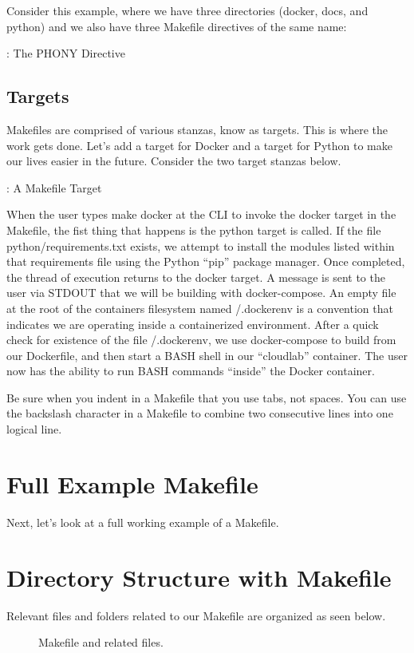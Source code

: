 \justify{}
Consider this example, where we have three directories (docker, docs, and python) and we also have three Makefile directives of the same name:

\begin{mybox}{\thetcbcounter: The PHONY Directive}
	
\end{mybox}

\subsection{Targets}

\justify{}
Makefiles are comprised of various stanzas, know as targets. This is where the work gets done. Let's add a target for Docker and a target for
Python to make our lives easier in the future. Consider the two target stanzas below.

\justify{}
\begin{mybox}{\thetcbcounter: A Makefile Target}
	
\end{mybox}

\justify{}
When the user types make docker at the CLI to invoke the docker target in the Makefile, the fist thing that happens is the python target is
called. If the file python/requirements.txt exists, we attempt to install the modules listed within that requirements file using the
Python ``pip'' package manager. Once completed, the thread of execution returns to the docker target. A message is sent to the user via STDOUT
that we will be building with docker-compose. An empty file at the root of the containers filesystem named /.dockerenv is a convention that
indicates we are operating inside a containerized environment. After a quick check for existence of the file /.dockerenv, we use docker-compose
to build from our Dockerfile, and then start a BASH shell in our ``cloudlab'' container. The user now has the ability to run BASH commands
``inside'' the Docker container.

\justify{}
Be sure when you indent in a Makefile that you use tabs, not spaces. You can use the backslash character in a Makefile to combine two consecutive
lines into one logical line.

\section{Full Example Makefile}
\justify{}
Next, let's look at a full working example of a Makefile.

\section{Directory Structure with Makefile}
\justify{}
Relevant files and folders related to our Makefile are organized as seen
below.

\begin{figure}[!htb]
	
	\caption{Makefile and related files.}
\label{makefile}
\end{figure}

